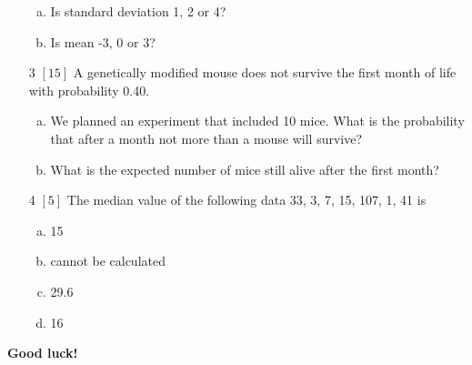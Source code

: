 \documentclass{article}
\begin{document}
\begin{itemize}
\begin{enumerate}[(a)]
\item Is standard deviation 1, 2 or 4? 
\vspace{\baselineskip}\item Is mean -3, 0 or 3? 
\vspace{\baselineskip}\end{enumerate}
\item[3] {\small $\left[15\right]$ }A genetically modified mouse does not survive the first month of life with probability 0.40.  
\begin{enumerate}[(a)]
\item We planned an experiment that included 10 mice. What is the probability that after a month not more than a mouse will survive? 
\vspace{\baselineskip} \vspace{\baselineskip} \vspace{\baselineskip}\item What is the expected number of mice still alive after the first month? 
\vspace{\baselineskip} \vspace{\baselineskip}\end{enumerate}
\item[4] {\small $\left[5\right]$ }The median value of the following data 33, 3, 7, 15, 107, 1, 41 is
\begin{enumerate}[(a)]
\item 15 
\item cannot be calculated 
\item 29.6 
\item 16 
\end{enumerate}
\end{itemize}
{\bf Good luck! }\newpage
\end{document}
